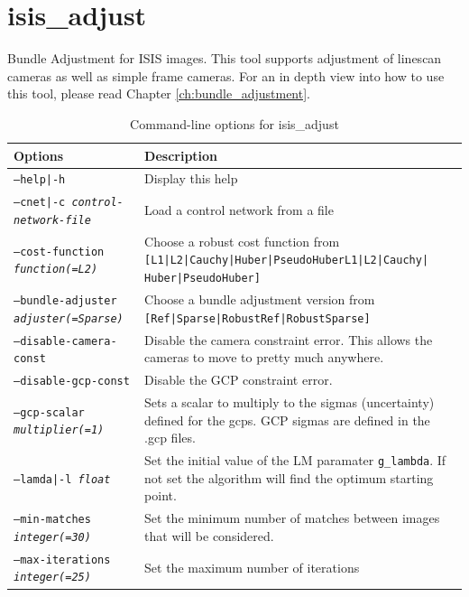 
\section{isis\_adjust}

Bundle Adjustment for \ac{ISIS} images. This tool supports adjustment of
linescan cameras as well as simple frame cameras. For an in depth view
into how to use this tool, please read Chapter
\ref{ch:bundle_adjustment}.

\begin{longtable}{|l|p{10cm}|}
\caption{Command-line options for isis\_adjust}
\label{tbl:isise_adjust}
\endfirsthead
\endhead
\endfoot
\endlastfoot
\hline
Options & Description \\ \hline \hline
\texttt{--help|-h} & Display this help \\ \hline
\texttt{--cnet|-c \textit{control-network-file}} & Load a control network from a file \\ \hline
\texttt{--cost-function \textit{function(=L2)}} & Choose a robust cost function from \texttt{[L1|L2|Cauchy|Huber|PseudoHuberL1|L2|Cauchy|} \texttt{Huber|PseudoHuber]} \\ \hline
\texttt{--bundle-adjuster \textit{adjuster(=Sparse)}} & Choose a bundle adjustment version from \texttt{[Ref|Sparse|RobustRef|RobustSparse]} \\ \hline
\texttt{--disable-camera-const} & Disable the camera constraint error. This allows the cameras to move to pretty much anywhere. \\ \hline
\texttt{--disable-gcp-const} & Disable the GCP constraint error. \\ \hline
\texttt{--gcp-scalar \textit{multiplier(=1)}} & Sets a scalar to multiply to the sigmas (uncertainty) defined for the gcps. GCP sigmas are defined in the .gcp files. \\ \hline
\texttt{--lamda|-l \textit{float}} & Set the initial value of the LM paramater \texttt{g\_lambda}. If not set the algorithm will find the optimum starting point. \\ \hline
\texttt{--min-matches \textit{integer(=30)}} & Set the minimum number of matches between images that will be considered. \\ \hline
\texttt{--max-iterations \textit{integer(=25)}} & Set the maximum number of iterations \\ \hline

\end{longtable}
